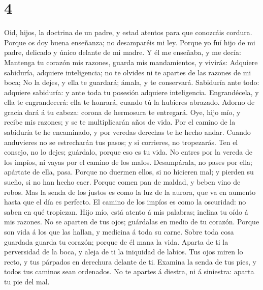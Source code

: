 \hypertarget{section-3}{%
\section{4}\label{section-3}}

 Oid, hijos, la doctrina de un padre, y estad atentos para
que conozcáis cordura.  Porque os doy buena enseñanza; no
desamparéis mi ley.  Porque yo fuí hijo de mi padre,
delicado y único delante de mi madre.  Y él me enseñaba, y
me decía: Mantenga tu corazón mis razones, guarda mis mandamientos, y
vivirás:  Adquiere sabiduría, adquiere inteligencia; no te
olvides ni te apartes de las razones de mi boca;  No la
dejes, y ella te guardará; ámala, y te conservará. 
Sabiduría ante todo: adquiere sabiduría: y ante toda tu posesión
adquiere inteligencia.  Engrandécela, y ella te
engrandecerá: ella te honrará, cuando tú la hubieres abrazado.
 Adorno de gracia dará á tu cabeza: corona de hermosura te
entregará.  Oye, hijo mío, y recibe mis razones; y se te
multiplicarán años de vida.  Por el camino de la sabiduría
te he encaminado, y por veredas derechas te he hecho andar.
 Cuando anduvieres no se estrecharán tus pasos; y si
corrieres, no tropezarás.  Ten el consejo, no lo dejes;
guárdalo, porque eso es tu vida.  No entres por la vereda
de los impíos, ni vayas por el camino de los malos. 
Desampárala, no pases por ella; apártate de ella, pasa. 
Porque no duermen ellos, si no hicieren mal; y pierden su sueño, si no
han hecho caer.  Porque comen pan de maldad, y beben vino
de robos.  Mas la senda de los justos es como la luz de la
aurora, que va en aumento hasta que el día es perfecto.  El
camino de los impíos es como la oscuridad: no saben en qué tropiezan.
 Hijo mío, está atento á mis palabras; inclina tu oído á
mis razones.  No se aparten de tus ojos; guárdalas en medio
de tu corazón.  Porque son vida á los que las hallan, y
medicina á toda su carne.  Sobre toda cosa guardada guarda
tu corazón; porque de él mana la vida.  Aparta de ti la
perversidad de la boca, y aleja de ti la iniquidad de labios.
 Tus ojos miren lo recto, y tus párpados en derechura
delante de ti.  Examina la senda de tus pies, y todos tus
caminos sean ordenados.  No te apartes á diestra, ni á
siniestra: aparta tu pie del mal.

